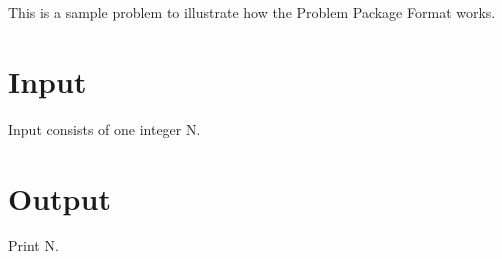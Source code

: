 This is a sample problem to illustrate how the Problem Package Format works.
\section*{Input}
Input consists of one integer N.
\section*{Output}
Print N.
